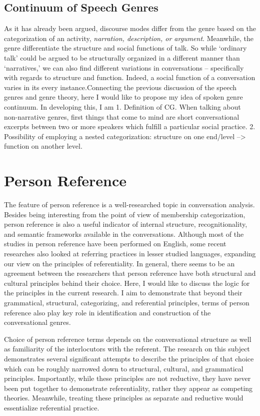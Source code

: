 \documentclass[12pt, draft]{article}
\begin{document}
\subsection{Continuum of Speech Genres}
As it has already been argued, discourse modes differ from the genre based on the categorization of an activity, \textit{narration, description, or argument}. Meanwhile, the genre differentiate the structure and social functions of talk. So while `ordinary talk' could be argued to be structurally organized in a different manner than `narratives,' we can also find different variations in conversations -- specifically with regards to structure and function. Indeed, a social function of a conversation varies in its every instance.Connecting the previous discussion of the speech genres and genre theory, here I would like to propose my idea of spoken genre continuum. In developing this, I am 
1.	Definition of CG.
When talking about non-narrative genres, first things that come to mind are short conversational excerpts between two or more speakers which fulfill a particular social practice.
2.	Possibility of employing a nested categorization: structure on one end/level --> function on another level.
\section{Person Reference}
The feature of person reference is a well-researched topic in conversation analysis. Besides being interesting from the point of view of membership categorization, person reference is also a useful indicator of internal structure, recognitionality, and semantic frameworks available in the conversations. Although most of the studies in person reference have been performed on English, some recent researches also looked at referring practices in lesser studied languages, expanding our view on the principles of referentiality. In general, there seems to be an agreement between the researchers that person reference have both structural and cultural principles behind their choice. Here, I would like to discuss the logic for the principles in the current research. I aim to demonstrate that beyond their grammatical, structural, categorizing, and referential principles, terms of person reference also play key role in identification and construction of the conversational genres.

Choice of person reference terms depends on the conversational structure as well as familiarity of the interlocutors with the referent. The research on this subject demonstrates several significant attempts to describe the principles of that choice which can be roughly narrowed down to structural, cultural, and grammatical principles. Importantly, while these principles are not reductive, they have never been put together to demonstrate referentiality, rather they appear as competing theories. Meanwhile, treating these principles as separate and reductive would essentialize referential practice. 
\end{document}
